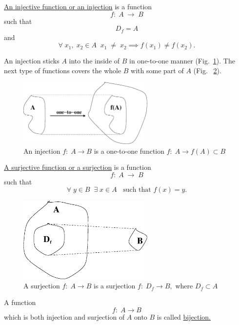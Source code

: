 \documentclass[color=black,11pt]{elegantpaper}
\begin{document}
\begin{definition}
\href{https://en.wikipedia.org/wiki/Injective_function}{An injective function or an injection} is a function
$$
f:\;A\;\to \; B
$$
such that
$$
D_f = A
$$
and 
$$
\forall\;x_1,\; x_2 \in A\;\;x_1 \; \not=\; x_2 \implies f(x_1) \not= f(x_2).
$$
\end{definition}
 An injection sticks $A$ into the inside of $B$ in one-to-one manner (Fig.~\ref{fig:injection}). The next type of functions covers the whole $B$ with some part of $A$ (Fig. ~\ref{fig:surjection}).
\begin{figure}[htbp]
  \centering
  \includegraphics[width=0.6\textwidth]{xfig_stuff/injection.eps}
  \caption{An injection $f:\;A \to B$ is a one-to-one function $f:\;A\to f(A)\subset B$ } 
  \label{fig:injection}
\end{figure}
\begin{definition}
\href{https://en.wikipedia.org/wiki/Surjective_function}{A surjective function or a surjection} is a function
$$
f:\;A\;\to \; B
$$
such that
$$
\forall \;y \in B\;\;\exists\;x \in A\;\;\mbox{ such that } f(x)=y.
$$
\end{definition}
\begin{figure}[htbp]
  \centering
  \includegraphics[width=0.6\textwidth]{xfig_stuff/surjection.eps}
  \caption{A surjection $f:\;A \to B$ is a surjection $f:\;D_f\to B,$ where $D_f \subset A$ }  
  \label{fig:surjection}
\end{figure}
A function 
$$
f:\;A \to B
$$
which is both injection and surjection of $A$ onto $B$ is called \href{https://en.wikipedia.org/wiki/Bijection}{bijection.}
\end{document}
